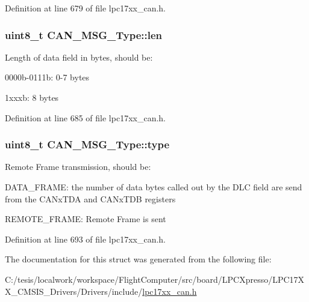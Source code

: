 \-Definition at line 679 of file lpc17xx\-\_\-can.\-h.

\hypertarget{struct_c_a_n___m_s_g___type_a2fcccafb45ef3e30053c8f54cbbe9818}{
\subsubsection[{len}]{\setlength{\rightskip}{0pt plus 5cm}uint8\-\_\-t {\bf \-C\-A\-N\-\_\-\-M\-S\-G\-\_\-\-Type\-::len}}}\label{struct_c_a_n___m_s_g___type_a2fcccafb45ef3e30053c8f54cbbe9818}
\-Length of data field in bytes, should be\-:
\begin{DoxyItemize}
\item 0000b-\/0111b\-: 0-\/7 bytes
\item 1xxxb\-: 8 bytes 
\end{DoxyItemize}

\-Definition at line 685 of file lpc17xx\-\_\-can.\-h.

\hypertarget{struct_c_a_n___m_s_g___type_a451e6dea08cf629d0b027037291089aa}{
\subsubsection[{type}]{\setlength{\rightskip}{0pt plus 5cm}uint8\-\_\-t {\bf \-C\-A\-N\-\_\-\-M\-S\-G\-\_\-\-Type\-::type}}}\label{struct_c_a_n___m_s_g___type_a451e6dea08cf629d0b027037291089aa}
\-Remote \-Frame transmission, should be\-:
\begin{DoxyItemize}
\item \-D\-A\-T\-A\-\_\-\-F\-R\-A\-M\-E\-: the number of data bytes called out by the \-D\-L\-C field are send from the \-C\-A\-Nx\-T\-D\-A and \-C\-A\-Nx\-T\-D\-B registers
\item \-R\-E\-M\-O\-T\-E\-\_\-\-F\-R\-A\-M\-E\-: \-Remote \-Frame is sent 
\end{DoxyItemize}

\-Definition at line 693 of file lpc17xx\-\_\-can.\-h.



\-The documentation for this struct was generated from the following file\-:\begin{DoxyCompactItemize}
\item 
\-C\-:/tesis/localwork/workspace/\-Flight\-Computer/src/board/\-L\-P\-C\-Xpresso/\-L\-P\-C17\-X\-X\-\_\-\-C\-M\-S\-I\-S\-\_\-\-Drivers/\-Drivers/include/\hyperlink{lpc17xx__can_8h}{lpc17xx\-\_\-can.\-h}\end{DoxyCompactItemize}
